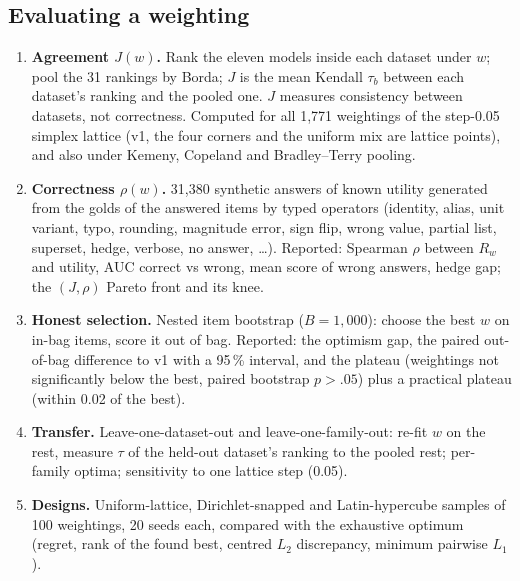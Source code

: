 \documentclass[11pt]{article}
\begin{document}
\subsection{Evaluating a weighting}
\begin{enumerate}
\item \textbf{Agreement $J(w)$.} Rank the eleven models inside each dataset under $w$; pool the 31 rankings by Borda; $J$ is the mean Kendall $\tau_b$ between each dataset's ranking and the pooled one. $J$ measures consistency between datasets, not correctness. Computed for all 1,771 weightings of the step-0.05 simplex lattice (v1, the four corners and the uniform mix are lattice points), and also under Kemeny, Copeland and Bradley--Terry pooling.
\item \textbf{Correctness $\rho(w)$.} 31,380 synthetic answers of known utility generated from the golds of the answered items by typed operators (identity, alias, unit variant, typo, rounding, magnitude error, sign flip, wrong value, partial list, superset, hedge, verbose, no answer, \dots). Reported: Spearman $\rho$ between $R_w$ and utility, AUC correct vs wrong, mean score of wrong answers, hedge gap; the $(J,\rho)$ Pareto front and its knee.
\item \textbf{Honest selection.} Nested item bootstrap ($B=1{,}000$): choose the best $w$ on in-bag items, score it out of bag. Reported: the optimism gap, the paired out-of-bag difference to v1 with a 95\,\% interval, and the plateau (weightings not significantly below the best, paired bootstrap $p>.05$) plus a practical plateau (within 0.02 of the best).
\item \textbf{Transfer.} Leave-one-dataset-out and leave-one-family-out: re-fit $w$ on the rest, measure $\tau$ of the held-out dataset's ranking to the pooled rest; per-family optima; sensitivity to one lattice step (0.05).
\item \textbf{Designs.} Uniform-lattice, Dirichlet-snapped and Latin-hypercube samples of 100 weightings, 20 seeds each, compared with the exhaustive optimum (regret, rank of the found best, centred $L_2$ discrepancy, minimum pairwise $L_1$).
\end{enumerate}
\end{document}
